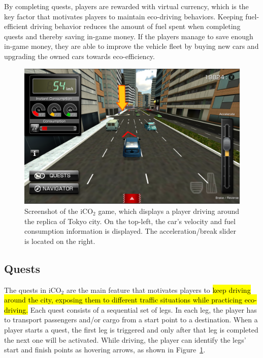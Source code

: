 \documentclass[preprint,authoryear,12pt]{elsarticle}
\newcommand{\hlc}[2][yellow]{ {\sethlcolor{#1} \hl{#2}} }
\begin{document}
By completing quests, players are rewarded with virtual currency, which is the key factor that motivates players to maintain eco-driving behaviors. Keeping fuel-efficient driving behavior reduces the amount of fuel spent when completing quests and thereby saving in-game money. If the players manage to save enough in-game money, they are able to improve the vehicle fleet by buying new cars and upgrading the owned cars towards eco-efficiency.

\begin{figure}[htb]
\begin{center}
\includegraphics[width=.95\linewidth]{ijhcs14-img/iCO2_driving}
\caption{Screenshot of the iCO$_2$ game, which displays a player driving around the replica of Tokyo city. On the top-left, the car's velocity and fuel consumption information is displayed. The acceleration/break slider is located on the right.\label{fig:iCO2_driving}}
\end{center}
\end{figure}

\subsection{Quests}

The quests in iCO$_2$ are the main feature that motivates players to
\hlc[green]{ keep driving around the city, exposing them to different traffic situations 
	while practicing eco-driving.} Each quest consists of a sequential set of legs. In each leg, the player has to transport passengers and/or cargo from a start point to a destination. When a player starts a quest, the first leg is triggered and only after that leg is completed the next one will be activated. While driving, the player can identify the legs' start and finish points as hovering arrows, as shown in Figure~\ref{fig:iCO2_driving}.
\end{document}
